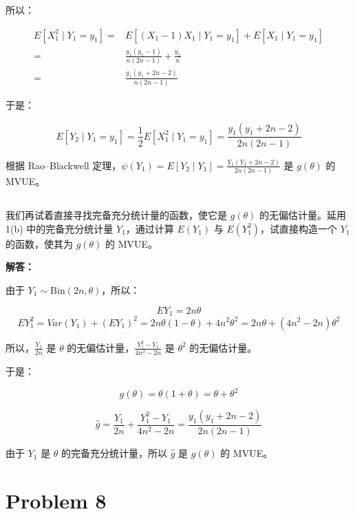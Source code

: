 \documentclass[12pt,a4paper]{article}
\begin{document}
\begin{answerbox}
所以：

$$
\begin{aligned}
E\left[X_1^2 \mid Y_1 = y_1\right] =& E\left[(X_1-1)X_1 \mid Y_1 = y_1\right] + E\left[X_1 \mid Y_1 = y_1\right] \\
=& \frac{y_1(y_1-1)}{n(2n-1)} + \frac{y_1}{n} \\
=& \frac{y_1(y_1+2n-2)}{n(2n-1)}
\end{aligned}
$$

于是：

$$
E\left[Y_2 \mid Y_1 = y_1\right] = \frac{1}{2} E\left[X_1^2 \mid Y_1 = y_1\right] = \frac{y_1(y_1+2n-2)}{2n(2n-1)}
$$

根据 Rao--Blackwell 定理，$\psi(Y_1) = E\left[Y_2 \mid Y_1\right] = \frac{Y_1(Y_1+2n-2)}{2n(2n-1)}$ 是 $g(\theta)$ 的 MVUE。


\end{answerbox}

\subsection{}

我们再试着直接寻找完备充分统计量的函数，使它是 $g(\theta)$ 的无偏估计量。延用 1(b) 中的完备充分统计量 $Y_1$，通过计算 $E(Y_1)$ 与 $E(Y_1^2)$，试直接构造一个 $Y_1$ 的函数，使其为 $g(\theta)$ 的 MVUE。

\begin{answerbox}
\textbf{解答：}

由于 $Y_1 \sim \text{Bin}(2n, \theta)$，所以：

$$
EY_1 = 2n\theta
$$
$$
EY_1^2 = Var(Y_1) + (EY_1)^2 = 2n\theta(1-\theta) + 4n^2 \theta^2 = 2n\theta + (4n^2-2n) \theta^2
$$

所以，$\frac{Y_1}{2n}$ 是 $\theta$ 的无偏估计量，$\frac{Y_1^2-Y_1}{4n^2-2n}$ 是 $\theta^2$ 的无偏估计量。

于是：

$$
g(\theta) = \theta(1+\theta) = \theta + \theta^2
$$

$$
\hat{g} = \frac{Y_1}{2n} + \frac{Y_1^2-Y_1}{4n^2-2n} =  \frac{y_1(y_1+2n-2)}{2n(2n-1)}
$$

由于 $Y_1$ 是 $\theta$ 的完备充分统计量，所以 $\hat{g}$ 是 $g(\theta)$ 的 MVUE。

\end{answerbox}

\section{Problem 8}
\end{document}
